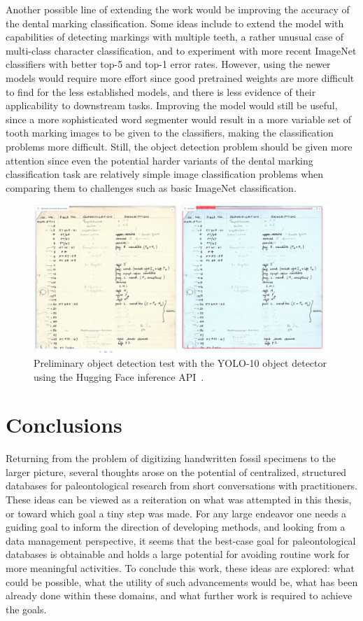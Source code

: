 \documentclass[english,twoside,openright]{UH_DS_MSc}
\begin{document}
Another possible line of extending the work would be improving the accuracy of the dental marking classification. 
Some ideas include to extend the model with capabilities of detecting markings with multiple teeth,
a rather unusual case of multi-class character classification, and to experiment with more recent ImageNet classifiers with better top-5 and top-1 error rates.
However, using the newer models would require more effort since good pretrained weights are 
more difficult to find for the less established models, and there is less evidence of their applicability to downstream tasks. Improving the model would still be useful, since a more sophisticated word segmenter would result in a more 
variable set of tooth marking images to be given to the classifiers, making the classification problems more difficult. 
Still, the object detection problem should be given more attention since even the 
potential harder variants of the dental marking classification task are relatively simple image classification problems when comparing 
them to challenges such as basic ImageNet classification.

\begin{figure}[ht]
    \centering
    \includegraphics*[scale=0.29]{images/yoloresult.png}
    \caption{Preliminary object detection test with the YOLO-10 object detector using the Hugging Face inference API~\cite{OmouredYOLOv10DocumentLayoutAnalysisHugging2023}.}
    \label{image:yolo}
\end{figure}

\chapter{Conclusions}

Returning from the problem of digitizing handwritten fossil specimens to the larger picture, several thoughts arose on the potential of centralized, structured databases for paleontological research from short conversations with practitioners.
These ideas can be viewed as a reiteration on what was attempted in this thesis, or toward which goal a tiny step was made. For any large endeavor one needs a guiding goal to inform the direction of developing methods, and looking from a data management perspective, it seems that the best-case goal for paleontological databases is obtainable and holds a large potential for avoiding routine work for more meaningful activities. To conclude this work, these ideas are explored: what could be possible, what the utility of such advancements would be, what has been already done within these domains, and what further work is required to achieve the goals.
\end{document}
